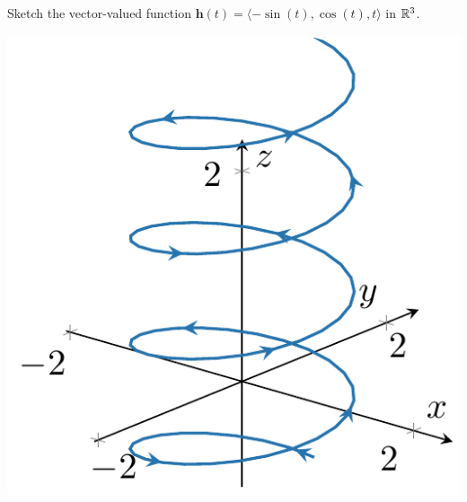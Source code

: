 \begin{example}\label{helix1}
Sketch the vector-valued function $\bm{h}(t) = \langle -\sin(t), \cos(t), t \rangle$ in $\mathbb{R}^3$.

 \begin{center}        
        \includegraphics[scale=.75]{chapters/2-RealAnalysis/figures/figures-helix.pdf}
    \end{center}
\end{example}

